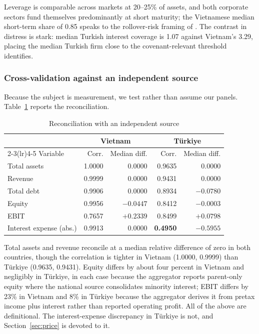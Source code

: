 \documentclass[review,12pt,authoryear]{elsarticle}
\theoremstyle{plain}
\theoremstyle{definition}
\begin{document}
Leverage is comparable across markets at 20--25\% of assets, and both corporate
sectors fund themselves predominantly at short maturity; the Vietnamese median
short-term share of 0.85 speaks to the rollover-risk framing of
\citet{hexiong2012}. The contrast in distress is stark: median Turkish interest
coverage is 1.07 against Vietnam's 3.29, placing the median Turkish firm close
to the covenant-relevant threshold \citet{greenwald2019} identifies.

\subsubsection{Cross-validation against an independent source}

Because the subject is measurement, we test rather than assume our panels.
Table~\ref{tab:xval} reports the reconciliation.

\begin{table}[htbp]
\centering
\caption{Reconciliation with an independent source}
\label{tab:xval}
\begin{tabular}{lrrrr}
\toprule
& \multicolumn{2}{c}{Vietnam} & \multicolumn{2}{c}{T\"{u}rkiye} \\
\cmidrule(lr){2-3}\cmidrule(lr){4-5}
Variable & Corr. & Median diff. & Corr. & Median diff. \\
\midrule
Total assets              & 1.0000 & 0.0000 & 0.9635 & 0.0000 \\
Revenue                   & 0.9999 & 0.0000 & 0.9431 & 0.0000 \\
Total debt                & 0.9906 & 0.0000 & 0.8934 & $-0.0780$ \\
Equity                    & 0.9956 & $-0.0447$ & 0.8412 & $-0.0003$ \\
EBIT                      & 0.7657 & $+0.2339$ & 0.8499 & $+0.0798$ \\
Interest expense (abs.)   & 0.9913 & 0.0000 & \textbf{0.4950} & $\mathbf{-0.5955}$ \\
\bottomrule
\end{tabular}
\end{table}

Total assets and revenue reconcile at a median relative difference of zero in
both countries, though the correlation is tighter in Vietnam (1.0000, 0.9999)
than T\"{u}rkiye (0.9635, 0.9431). Equity differs by about four percent in
Vietnam and negligibly in T\"{u}rkiye, in each case because the aggregator
reports parent-only equity where the national source consolidates minority
interest; EBIT differs by 23\% in Vietnam and 8\% in T\"{u}rkiye because the
aggregator derives it from pretax income plus interest rather than reported
operating profit. All of the above are definitional. The interest-expense
discrepancy in T\"{u}rkiye is not, and Section~\ref{sec:price} is devoted to
it.
\end{document}

